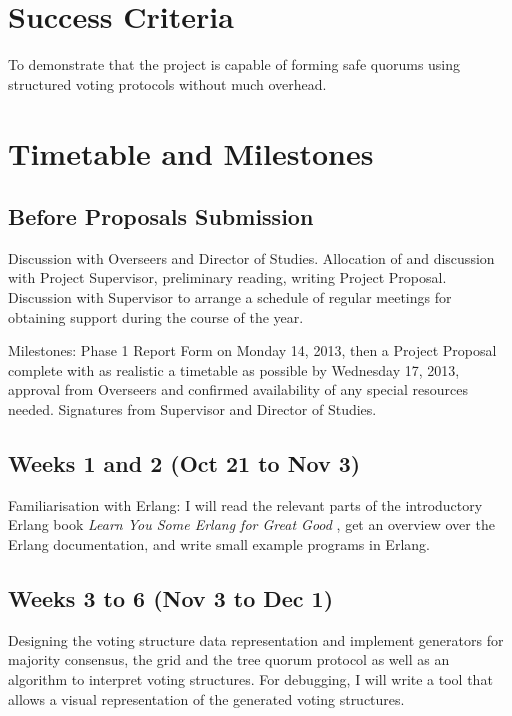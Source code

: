 \documentclass[12pt]{scrartcl}
\begin{document}
\section{Success Criteria%
  \label{success-criteria}%
}

To demonstrate that the project is capable of forming safe quorums using structured voting protocols without much overhead.


\section{Timetable and Milestones%
  \label{timetable-and-milestones}%
}


\subsection{Before Proposals Submission%
  \label{before-proposals-submission}%
}

Discussion with Overseers and Director of Studies. Allocation of and discussion with Project Supervisor, preliminary reading, writing Project Proposal. Discussion with Supervisor to arrange a schedule of regular meetings for obtaining support during the course of the year.

Milestones: Phase 1 Report Form on Monday 14, 2013, then a Project Proposal complete with as realistic a timetable as possible by Wednesday 17, 2013, approval from Overseers and confirmed availability of any special resources needed. Signatures from Supervisor and Director of Studies.


\subsection{Weeks 1 and 2 (Oct 21 to Nov 3)%
  \label{weeks-1-and-2-oct-21-to-nov-3}%
}

Familiarisation with Erlang: I will read the relevant parts of the introductory Erlang book \emph{Learn You Some Erlang for Great Good} \cite{lysefgg}, get an overview over the Erlang documentation, and write small example programs in Erlang.


\subsection{Weeks 3 to 6 (Nov 3 to Dec 1)%
  \label{weeks-3-to-6-nov-3-to-dec-1}%
}

Designing the voting structure data representation and implement generators for majority consensus, the grid and the tree quorum protocol as well as an algorithm to interpret voting structures. For debugging, I will write a tool that allows a visual representation of the generated voting structures.
\end{document}
